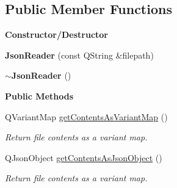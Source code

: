 \subsection*{Public Member Functions}
\begin{Indent}\textbf{ Constructor/\+Destructor}\par
\begin{DoxyCompactItemize}
\item 
\mbox{\label{classrev_1_1_json_reader_ae434fbf0597aac3e3f1abe2e16be8637}} 
{\bfseries Json\+Reader} (const Q\+String \&filepath)
\item 
\mbox{\label{classrev_1_1_json_reader_aeab1766bb7bedaad28330a91e3db5264}} 
{\bfseries $\sim$\+Json\+Reader} ()
\end{DoxyCompactItemize}
\end{Indent}
\begin{Indent}\textbf{ Public Methods}\par
\begin{DoxyCompactItemize}
\item 
\mbox{\label{classrev_1_1_json_reader_af67b4520c78aece76abcd53acd7eb482}} 
Q\+Variant\+Map \mbox{\hyperlink{classrev_1_1_json_reader_af67b4520c78aece76abcd53acd7eb482}{get\+Contents\+As\+Variant\+Map}} ()
\begin{DoxyCompactList}\small\item\em Return file contents as a variant map. \end{DoxyCompactList}\item 
\mbox{\label{classrev_1_1_json_reader_a757d88b9b91d865cf51882c416d58175}} 
Q\+Json\+Object \mbox{\hyperlink{classrev_1_1_json_reader_a757d88b9b91d865cf51882c416d58175}{get\+Contents\+As\+Json\+Object}} ()
\begin{DoxyCompactList}\small\item\em Return file contents as a variant map. \end{DoxyCompactList}\end{DoxyCompactItemize}
\end{Indent}
